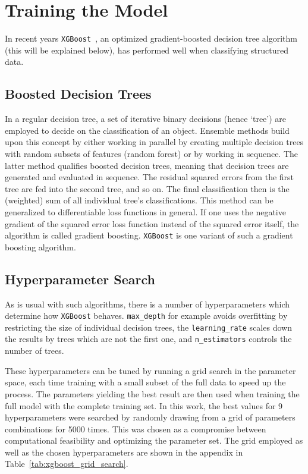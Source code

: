 \section{Training the Model}
In recent years \texttt{XGBoost}~, an optimized gradient-boosted decision tree algorithm (this will be explained below), has performed well when classifying structured data.

\subsection{Boosted Decision Trees}
In a regular decision tree, a set of iterative binary decisions (hence `tree') are employed to decide on the classification of an object. Ensemble methods build upon this concept by either working in parallel by creating multiple decision trees with random subsets of features (random forest) or by working in sequence. The latter method qualifies boosted decision trees, meaning that decision trees are generated and evaluated in sequence. The residual squared errors from the first tree are fed into the second tree, and so on. The final classification then is the (weighted) sum of all individual tree's classifications. This method can be generalized to differentiable loss functions in general. If one uses the negative gradient of the squared error loss function instead of the squared error itself, the algorithm is called gradient boosting. \texttt{XGBoost} is one variant of such a gradient boosting algorithm.

\subsection{Hyperparameter Search}
As is usual with such algorithms, there is a number of hyperparameters which determine how \texttt{XGBoost} behaves. \texttt{max\_depth} for example avoids overfitting by restricting the size of individual decision trees, the \texttt{learning\_rate} scales down the results by trees which are not the first one, and \texttt{n\_estimators} controls the number of trees.

These hyperparameters can be tuned by running a grid search in the parameter space, each time training with a small subset of the full data to speed up the process. The parameters yielding the best result are then used when training the full model with the complete training set. In this work, the best values for 9 hyperparameters were searched by randomly drawing from a grid of parameters combinations for 5000 times. This was chosen as a compromise between computational feasibility and optimizing the parameter set. The grid employed as well as the chosen hyperparameters are shown in the appendix in Table~\ref{tab:xgboost_grid_search}.

